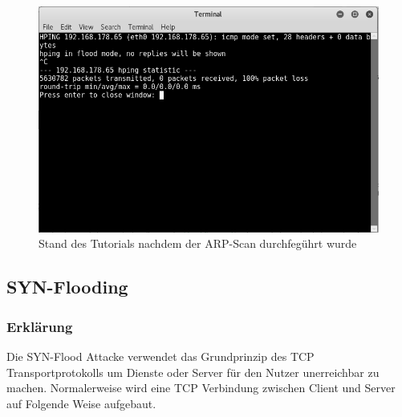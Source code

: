 \begin{figure}[H]
	\centering
	\includegraphics[width=\textwidth]{images/dos/pingflood}
	\caption{Stand des Tutorials nachdem der ARP-Scan durchfegührt wurde}
	\label{fig:pingflood}
\end{figure}

\subsection{SYN-Flooding} 

\subsubsection{Erklärung}

Die SYN-Flood Attacke verwendet das Grundprinzip des TCP Transportprotokolls um Dienste oder Server für den Nutzer unerreichbar zu machen. Normalerweise wird eine TCP Verbindung zwischen Client und Server auf Folgende Weise aufgebaut. 

